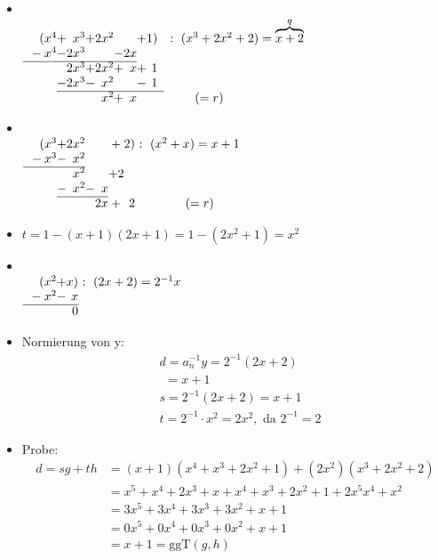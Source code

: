 \documentclass[12pt,titlepage, pdf]{article}
\renewcommand{\>}{\rightarrow}
\renewcommand{\*}{\cdot}
\begin{document}
	\begin{itemize}
		\item ~\\
		$\begin{array}{r@{}c@{}r@{}c@{}r@{}c@{}r@{}c@{}rl}
		(x^4 & + &  x^3 & + & 2x^2 &   &  & + & 1)& :  ~ (x^3+2x^2+2) = \overbrace{x+2}^{q}\\
		{}-x^4 &- & 2x^3 &  & &-&2x \\ \cline{1-7} 
		&  & 2x^3 & + & 2x^2 & + & x&+&1 \\
		&- &2x^3 & - & x^2 &  & &-&1 \\ \cline{2-9}
		&  &      &   & x^2 & +  &  x&&&\qquad (=r)
		\end{array}$
		\item ~\\
		$\begin{array}{r@{}c@{}r@{}c@{}r@{}c@{}r@{}c@{}rl}
		(x^3 & + &  2x^2&&&+&2)&~ :  ~ (x^2+x) =x+1\\
		{}-x^3&-&x^2\\ \cline{1-3}
		&&x^2&&&+2\\
		&-&x^2&-&x\\\cline{2-5}
		&&&&2x&+&2&\qquad (=r)
		\end{array}$
		\item $ t = 1-(x+1)(2x+1) = 1-(2x^2 + 1) = x^2$ \\
		\item ~\\
		$\begin{array}{r@{}c@{}r@{}c@{}r@{}c@{}r@{}c@{}rl}
		(x^2 & + &  x)&~ :  ~ (2x+2) =2^{-1}x\\
		{}-x^2&-&x\\ \cline{1-3}
		&&0
		\end{array}$
		\item Normierung von y: \\
		\begin{align*}
		&d = a_n^{-1} y = 2^{-1}(2x +2) \\&~~= x +1 \\
		&s = 2^{-1}(2x +2) = x+1 \\
		&t = 2^{-1} \cdot x^2 = 2x^2,\text{ da } 2^{-1} = 2
		\end{align*}
		\item Probe: \\
		\begin{align*}
		d = sg + th &=(x+1)(x^4 + x^3 + 2x^2 + 1) + (2x^2)(x^3 + 2x^2 + 2) \\
		&= x^5 + x^4 + 2x^3 + x + x^4 + x^3 + 2x^2 + 1 + 2x^5 x^4+ x^2 \\
		&= 3x^5 + 3x^4 +3x^3 + 3x^2 + x+1 \\
		&= 0x^5 + 0x^4 +0x^3 + 0x^2 + x+1 \\ 
		&= x+1 = \text{ggT}(g,h)
		\end{align*}
	\end{itemize}
\end{document}
